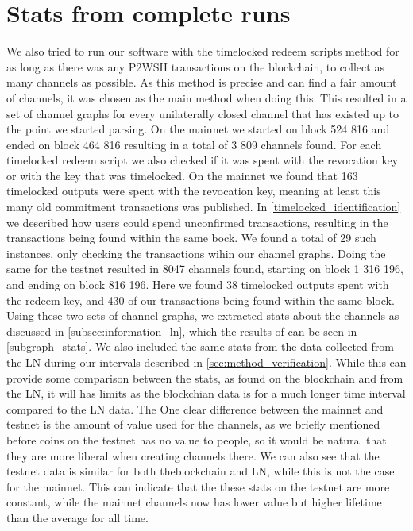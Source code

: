 \section{Stats from complete runs}
\label{sec:fullrun}

We also tried to run our software with the timelocked redeem scripts method for as long as there was any P2WSH transactions on the blockchain, to collect as many channels as possible. As this method is precise and can find a fair amount of channels, it was chosen as the main method when doing this. This resulted in a set of channel graphs for every unilaterally closed channel that has existed up to the point we started parsing. On the mainnet we started on block 524 816 and ended on block 464 816 resulting in a total of 3 809 channels found. For each timelocked redeem script we also checked if it was spent with the revocation key or with the key that was timelocked. On the mainnet we found that 163 timelocked outputs were spent with the revocation key, meaning at least this many old commitment transactions was published. In \cref{timelocked_identification} we described how users could spend unconfirmed transactions, resulting in the transactions being found within the same bock. We found a total of 29 such instances, only checking the transactions wihin our channel graphs.
Doing the same for the testnet resulted in 8047 channels found, starting on block 1 316 196, and ending on block 816 196. Here we found 38 timelocked outputs spent with the redeem key, and 430 of our transactions being found within the same block.
Using these two sets of channel graphs, we extracted stats about the channels as discussed in \cref{subsec:information_ln}, which the results of can be seen in \cref{subgraph_stats}.
We also included the same stats from the data collected from the LN during our intervals described in \cref{sec:method_verification}. 
While this can provide some comparison between the stats, as found on the blockchain and from the LN, it will has limits as the blockchian data is for a much longer time interval compared to the LN data.
The One clear difference between the mainnet and testnet is the amount of value used for the channels, as we briefly mentioned before coins on the testnet has no value to people, so it would be natural that they are more liberal when creating channels there. We can also see that the testnet data is similar for both theblockchain and LN, while this is not the case for the mainnet. This can indicate that the these stats on the testnet are more constant, while the mainnet channels now has lower value but higher lifetime than the average for all time.
\\

